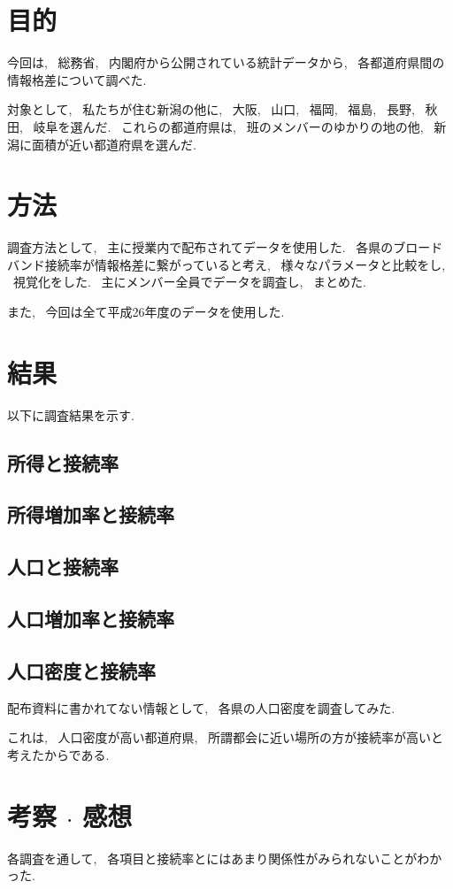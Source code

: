 \documentclass{jsarticle}
\begin{document}
\section{目的}
    今回は, ~総務省, ~内閣府から公開されている統計データから,
    ~各都道府県間の情報格差について調べた.

    対象として, ~私たちが住む新潟の他に, ~大阪, ~山口, ~福岡,
    ~福島, ~長野, ~秋田, ~岐阜を選んだ.
    ~これらの都道府県は, ~班のメンバーのゆかりの地の他,
    ~新潟に面積が近い都道府県を選んだ.

\section{方法}
    調査方法として, ~主に授業内で配布されてデータを使用した.
    ~各県のブロードバンド接続率が情報格差に繋がっていると考え,
    ~様々なパラメータと比較をし, ~視覚化をした.
    ~主にメンバー全員でデータを調査し, ~まとめた.

    また, ~今回は全て平成26年度のデータを使用した.

\section{結果}
    以下に調査結果を示す.

    \subsection{所得と接続率}

    \subsection{所得増加率と接続率}

    \subsection{人口と接続率}

    \subsection{人口増加率と接続率}

    \subsection{人口密度と接続率}
        配布資料に書かれてない情報として,
        ~各県の人口密度を調査してみた.

        これは, ~人口密度が高い都道府県,
        ~所謂都会に近い場所の方が接続率が高いと考えたからである.

\section{考察 $\cdot$ 感想}
    各調査を通して, ~各項目と接続率とにはあまり関係性がみられないことがわかった.


\end{document}
